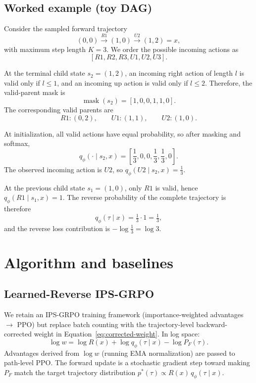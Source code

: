 \documentclass[11pt]{article}
\newcommand{\PF}{P_F}
\newcommand{\qphi}{q_\phi}
\newcommand{\R}{R}
\begin{document}
\subsection{Worked example (toy DAG)}

Consider the sampled forward trajectory
\[
(0,0)
\xrightarrow{R1}
(1,0)
\xrightarrow{U2}
(1,2)=x,
\]
with maximum step length \(K=3\). We order the possible incoming actions as
\[
[R1,R2,R3,U1,U2,U3].
\]

At the terminal child state \(s_2=(1,2)\), an incoming right action of length \(l\) is valid only if \(l\leq 1\), and an incoming up action is valid only if \(l\leq 2\). Therefore, the valid-parent mask is
\[
\operatorname{mask}(s_2)
=
[1,0,0,1,1,0].
\]
The corresponding valid parents are
\[
R1:(0,2),\qquad
U1:(1,1),\qquad
U2:(1,0).
\]

At initialization, all valid actions have equal probability, so after masking and softmax,
\[
\qphi(\cdot\mid s_2,x)
=
\left[
\frac13,0,0,\frac13,\frac13,0
\right].
\]
The observed incoming action is \(U2\), so \(\qphi(U2\mid s_2,x)=\tfrac13\).

At the previous child state \(s_1=(1,0)\), only \(R1\) is valid, hence \(\qphi(R1\mid s_1,x)=1\). The reverse probability of the complete trajectory is therefore
\[
\qphi(\tau\mid x)
=
\tfrac13\cdot 1
=
\tfrac13,
\]
and the reverse loss contribution is \(-\log\tfrac13=\log 3\).

\section{Algorithm and baselines}
\label{sec:algo}

\subsection{Learned-Reverse IPS-GRPO}

We retain an IPS-GRPO training framework (importance-weighted advantages \(\rightarrow\) PPO) but replace batch counting with the trajectory-level backward-corrected weight in Equation~\eqref{eq:corrected-weight}. In log space:
\begin{equation}
    \log w = \log \R(x) + \log \qphi(\tau\mid x) - \log \PF(\tau).
\end{equation}
Advantages derived from \(\log w\) (running EMA normalization) are passed to path-level PPO. The forward update is a stochastic gradient step toward making \(\PF\) match the target trajectory distribution \(p^*(\tau)\propto \R(x)\,\qphi(\tau\mid x)\).
\end{document}
